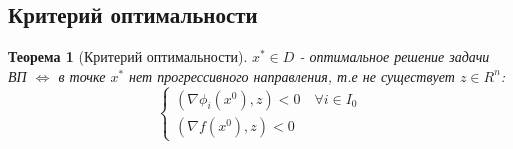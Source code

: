 \documentclass[a4paper]{article}
\newtheorem{theorem}{Теорема}[section]
\theoremstyle{definition}
\theoremstyle{remark}
\begin{document}
\subsection{Критерий оптимальности}
\begin{theorem}[Критерий оптимальности]
    $x^* \in D$ - оптимальное решение задачи ВП $\Leftrightarrow$
    в точке $x^*$ нет прогрессивного направления, т.е не существует $z\in R^n$: 
    \[\begin{cases}
        (\nabla \phi_i(x^0), z)<0 \quad \forall i \in I_0 \\
        (\nabla f(x^0), z)<0 
    \end{cases}\]
\end{theorem}
\end{document}
